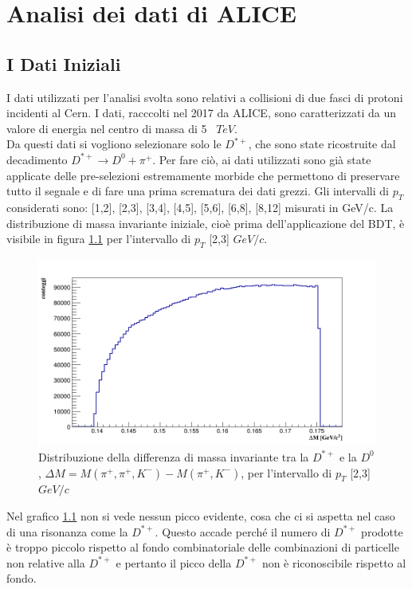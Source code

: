 \chapter{Analisi dei dati di ALICE} \label{Analisi}


\section{I Dati Iniziali}

I dati utilizzati per l'analisi svolta sono relativi a collisioni di due fasci di protoni incidenti al Cern. I dati, racccolti nel 2017 da ALICE, sono caratterizzati da un valore di energia nel centro di massa di 5 \ $TeV$. 
\\Da questi dati si vogliono selezionare solo le $D^{*+}$, che sono state ricostruite dal decadimento $D^{*+} \rightarrow D^0 + \pi^+ $. Per fare ciò, ai dati utilizzati sono già state applicate delle pre-selezioni estremamente morbide che permettono di preservare tutto il segnale e di fare una prima scrematura dei dati grezzi.
Gli intervalli di $p_T$ considerati sono: [1,2], [2,3], [3,4], [4,5], [5,6], [6,8], [8,12] misurati in GeV/c. 
La distribuzione di massa invariante iniziale, cioè prima dell'applicazione del BDT, è visibile in figura \ref{fig:grafmassDstar1} per l'intervallo di $p_T$ [2,3] $GeV/c$.

    \begin{figure}[htbp]
        \centering
        \includegraphics[width=0.7\linewidth]{AnalisiDati/dati_2_3.png}
        \caption{Distribuzione della differenza di massa invariante tra la $D^{*+}$ e la $D^0$, $\Delta M = M(\pi^+,\pi^+,K^-) - M(\pi^+,K^-)$, per l'intervallo di $p_T$ [2,3] $GeV/c$}
        \label{fig:grafmassDstar1}
    \end{figure}
    
Nel grafico \ref{fig:grafmassDstar1} non si vede nessun picco evidente, cosa che ci si aspetta nel caso di una risonanza come la $D^{*+}$. Questo accade perché il numero di $D^{*+}$ prodotte è troppo piccolo rispetto al fondo combinatoriale delle combinazioni di particelle non relative alla $D^{*+}$ e pertanto il picco della $D^{*+}$ non è riconoscibile rispetto al fondo.

